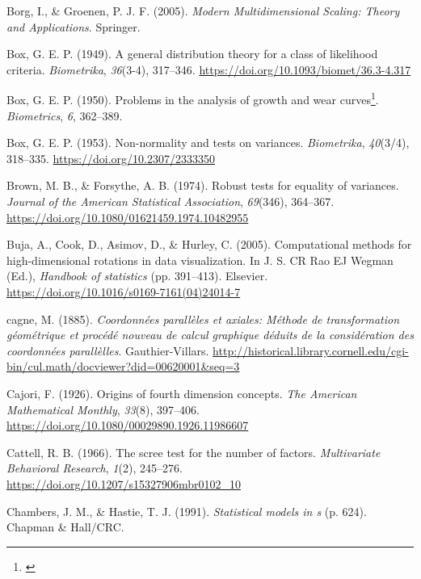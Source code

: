 \documentclass[
  letterpaper,
  10pt,
  krantz2]{krantz}
\newlength{\cslhangindent}
\newenvironment{CSLReferences}[2] %
 {\begin{list}{}{%
  \setlength{\itemindent}{0pt}
  \setlength{\leftmargin}{0pt}
  \setlength{\parsep}{0pt}
  \ifodd #1
   \setlength{\leftmargin}{\cslhangindent}
   \setlength{\itemindent}{-1\cslhangindent}
  \fi
  \setlength{\itemsep}{#2\baselineskip}}}
 {\end{list}}
\providecommand{\href}[2]{#2\footnote{\url{#1}}}
\begin{document}
{\begin{CSLReferences}{1}{0}
Borg, I., \& Groenen, P. J. F. (2005). \emph{{Modern Multidimensional
Scaling: Theory and Applications}}. Springer.

Box, G. E. P. (1949). A general distribution theory for a class of
likelihood criteria. \emph{Biometrika}, \emph{36}(3-4), 317--346.
\url{https://doi.org/10.1093/biomet/36.3-4.317}

Box, G. E. P. (1950). \href{}{Problems in the analysis of growth and
wear curves}. \emph{Biometrics}, \emph{6}, 362--389.

Box, G. E. P. (1953). Non-normality and tests on variances.
\emph{Biometrika}, \emph{40}(3/4), 318--335.
\url{https://doi.org/10.2307/2333350}

Brown, M. B., \& Forsythe, A. B. (1974). Robust tests for equality of
variances. \emph{Journal of the American Statistical Association},
\emph{69}(346), 364--367.
\url{https://doi.org/10.1080/01621459.1974.10482955}

Buja, A., Cook, D., Asimov, D., \& Hurley, C. (2005). Computational
methods for high-dimensional rotations in data visualization. In J. S.
CR Rao EJ Wegman (Ed.), \emph{Handbook of statistics} (pp. 391--413).
Elsevier. \url{https://doi.org/10.1016/s0169-7161(04)24014-7}

cagne, M. (1885). \emph{Coordonn{é}es parall{è}les et axiales: M{é}thode
de transformation g{é}om{é}trique et proc{é}d{é} nouveau de calcul
graphique d{é}duits de la consid{é}ration des coordonn{é}es
parall{è}lles}. Gauthier-Villars.
\url{http://historical.library.cornell.edu/cgi-bin/cul.math/docviewer?did=00620001&seq=3}

Cajori, F. (1926). Origins of fourth dimension concepts. \emph{The
American Mathematical Monthly}, \emph{33}(8), 397--406.
\url{https://doi.org/10.1080/00029890.1926.11986607}

Cattell, R. B. (1966). The scree test for the number of factors.
\emph{Multivariate Behavioral Research}, \emph{1}(2), 245--276.
\url{https://doi.org/10.1207/s15327906mbr0102_10}

Chambers, J. M., \& Hastie, T. J. (1991). \emph{Statistical models in s}
(p. 624). Chapman \& Hall/CRC.


\end{CSLReferences}}
\end{document}
